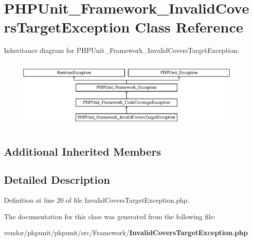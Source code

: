 \section{P\+H\+P\+Unit\+\_\+\+Framework\+\_\+\+Invalid\+Covers\+Target\+Exception Class Reference}
\label{class_p_h_p_unit___framework___invalid_covers_target_exception}
Inheritance diagram for P\+H\+P\+Unit\+\_\+\+Framework\+\_\+\+Invalid\+Covers\+Target\+Exception\+:\begin{figure}[H]
\begin{center}
\leavevmode
\includegraphics[height=3.589744cm]{class_p_h_p_unit___framework___invalid_covers_target_exception}
\end{center}
\end{figure}
\subsection*{Additional Inherited Members}


\subsection{Detailed Description}


Definition at line 20 of file Invalid\+Covers\+Target\+Exception.\+php.



The documentation for this class was generated from the following file\+:\begin{DoxyCompactItemize}
\item 
vendor/phpunit/phpunit/src/\+Framework/{\bf Invalid\+Covers\+Target\+Exception.\+php}\end{DoxyCompactItemize}
